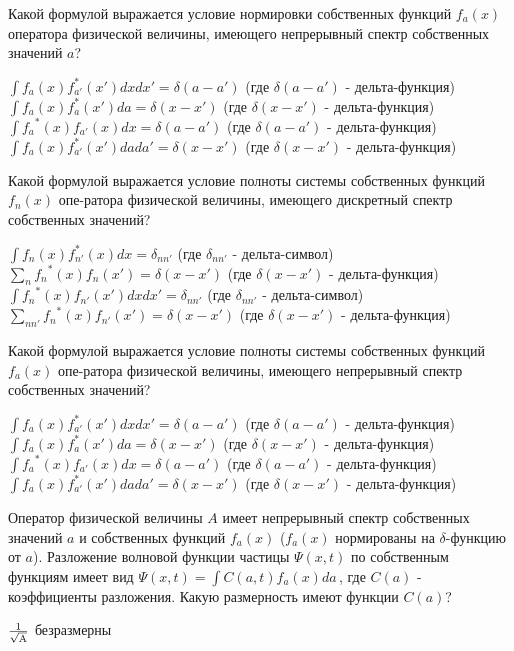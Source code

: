 \documentclass[11pt,a4paper]{exam}
\begin{document}
\begin{questions}
\question Какой формулой выражается условие нормировки собственных функций ${f_a}(x)$ оператора физической величины, имеющего непрерывный спектр собственных значений $a$?
\begin{choices}
\choice $\int {{f_a}(x)f_{a'}^*(x')dxdx' = } \delta (a - a')$ (где $\delta (a - a')$ - дельта-функция)
\choice $\int {{f_a}(x)f_a^*(x')da = } \delta (x - x')$ (где $\delta (x - x')$ - дельта-функция)
\choice $\int {{f_a}^*(x){f_{a'}}(x)} dx = \delta (a - a')$ (где $\delta (a - a')$ - дельта-функция)
\choice $\int {{f_a}(x)f_{a'}^*(x')dada' = } \delta (x - x')$ (где $\delta (x - x')$ - дельта-функция)
\end{choices}

\question Какой формулой выражается условие полноты системы собственных функций ${f_n}(x)$ опе-ратора физической величины, имеющего дискретный спектр собственных значений?
\begin{choices}
\choice $\int {{f_n}(x)f_{n'}^*(x)dx = } {\delta _{nn'}}$ (где ${\delta _{nn'}}$ - дельта-символ)
\choice $\sum\limits_n {{f_n}^*(x){f_n}(x')}  = \delta (x - x')$ (где $\delta (x - x')$ - дельта-функция)
\choice $\int {{f_n}^*(x){f_{n'}}(x')dxdx' = } {\delta _{nn'}}$ (где ${\delta _{nn'}}$ - дельта-символ)
\choice $\sum\limits_{nn'} {{f_n}^*(x){f_{n'}}(x')}  = \delta (x - x')$ (где $\delta (x - x')$ - дельта-функция)
\end{choices}

\question Какой формулой выражается условие полноты системы собственных функций ${f_a}(x)$ опе-ратора физической величины, имеющего непрерывный спектр собственных значений?
\begin{choices}
\choice $\int {{f_a}(x)f_{a'}^*(x')dxdx' = } \delta (a - a')$ (где $\delta (a - a')$ - дельта-функция)
\choice $\int {{f_a}(x)f_a^*(x')da = } \delta (x - x')$ (где $\delta (x - x')$ - дельта-функция)
\choice $\int {{f_a}^*(x){f_{a'}}(x)} dx = \delta (a - a')$ (где $\delta (a - a')$ - дельта-функция)
\choice $\int {{f_a}(x)f_{a'}^*(x')dada' = } \delta (x - x')$ (где $\delta (x - x')$ - дельта-функция)
\end{choices}

\question Оператор физической величины $A$ имеет непрерывный спектр собственных значений $a$ и собственных функций ${f_a}(x)$ (${f_a}(x)$ нормированы на $\delta $-функцию от $a$). Разложение волновой функции частицы $\Psi (x,t)$ по собственным функциям имеет вид $\Psi (x,t) = \int {C(a,t){f_a}(x)da} \,$, где $C(a)$ - коэффициенты разложения. Какую размерность имеют функции $C(a)$?
\begin{choices}
\choice $\frac{1}{{\sqrt {\rm{A}} }}$     
\choice     
\choice безразмерны     
\choice 
\end{choices}


\end{questions}
\end{document}
